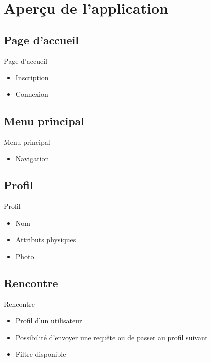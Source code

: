 \documentclass{beamer}
\begin{document}
\section{Aperçu de l'application}

\subsection*{Page d'accueil}

\begin{frame}{Page d'accueil}
  \begin{itemize}
  \item {
    Inscription
  }
  \item {
    Connexion
  }
  \end{itemize}
\end{frame}

\subsection*{Menu principal}


\begin{frame}{Menu principal}
  \begin{itemize}
  \item {
	Navigation
  }
  \end{itemize}
\end{frame}

\subsection*{Profil}

\begin{frame}{Profil}

	\begin{itemize}
	
	\item{
	Nom	
	}
	\item{
	Attributs physiques	
	}
	
	\item{
	Photo
	}
	\end{itemize}

\end{frame}

\subsection*{Rencontre}
\begin{frame}{Rencontre}
	\begin{itemize}
	\item{
	Profil d'un utilisateur
	}
	\item{
	Possibilité d'envoyer une requête ou de passer au profil suivant
	}
	\item{
	Filtre disponible
	}
	\end{itemize}
\end{frame}
\end{document}
